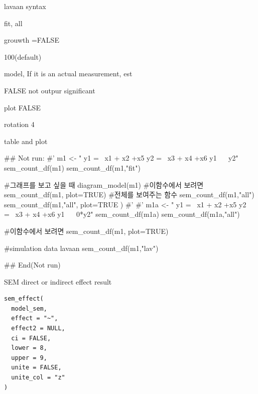 \documentclass[a4paper]{book}
\begin{document}
\begin{Arguments}
\begin{ldescription}
\item[\code{model}] lavaan syntax

\item[\code{type}] fit, all

\item[\code{growth}] grouwth =FALSE

\item[\code{sample.nobs}] 100(default)

\item[\code{whatLabels}] model, If it is an actual measurement, est

\item[\code{sig}] FALSE not outpur significant

\item[\code{plot}] plot FALSE

\item[\code{rotation}] rotation 4
\end{ldescription}
\end{Arguments}
%
\begin{Value}
table and plot
\end{Value}
%
\begin{Examples}
\begin{ExampleCode}

\#\# Not run: 
#'
m1 <- "
y1 =~ x1 + x2 +x5
y2 =~ x3 + x4 +x6
y1 ~~ y2"
sem_count_df(m1)
sem_count_df(m1,"fit")

#그래프를 보고 싶을 때
diagram_model(m1)
#이함수에서 보려면
sem_count_df(m1, plot=TRUE)
#전체를 보여주는 함수
sem_count_df(m1,"all")
sem_count_df(m1,"all", plot=TRUE )
#'
#'
m1a <- "
y1 =~ x1 + x2 +x5
y2 =~ x3 + x4 +x6
y1 ~~ 0*y2"
sem_count_df(m1a)
sem_count_df(m1a,"all")

#이함수에서 보려면
sem_count_df(m1, plot=TRUE)

#simulation data lavaan
sem_count_df(m1,"lav")


## End(Not run)
\end{ExampleCode}
\end{Examples}
%
\begin{Description}
SEM direct or indirect  effect result
\end{Description}
%
\begin{Usage}
\begin{verbatim}
sem_effect(
  model_sem,
  effect = "~",
  effect2 = NULL,
  ci = FALSE,
  lower = 8,
  upper = 9,
  unite = FALSE,
  unite_col = "z"
)
\end{verbatim}
\end{Usage}
\end{document}
